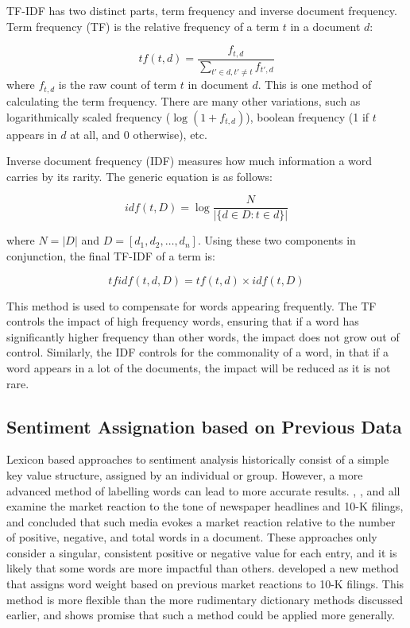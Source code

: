 TF-IDF has two distinct parts, term frequency and inverse document frequency. Term frequency (TF) is the relative frequency of a term $t$ in a document $d$:

\begin{equation}
tf(t,d) =  \frac{f_{t,d}}{\sum_{t'\in d, t' \neq t} f_{t',d}}
\end{equation}
where $f_{t,d}$ is the raw count of term $t$ in document $d$. This is one method of calculating the term frequency. There are many other variations, such as logarithmically scaled frequency ($\log(1 + f_{t,d})$), boolean frequency (1 if $t$ appears in $d$ at all, and 0 otherwise), etc.

Inverse document frequency (IDF) measures how much information a word carries by its rarity. The generic equation is as follows:

\begin{equation}
idf(t,D) = \log \frac{N}{|\{d \in D: t \in d\}|}
\end{equation}

\noindent
where $N = |D|$ and $D = [d_1, d_2, \dots, d_n]$. Using these two components in conjunction, the final TF-IDF of a term is:

\begin{equation}
tfidf(t,d,D) = tf(t,d) \times idf(t,D)
\end{equation}

\noindent
This method is used to compensate for words appearing frequently. The TF controls the impact of high frequency words, ensuring that if a word has significantly higher frequency than other words, the impact does not grow out of control. Similarly, the IDF controls for the commonality of a word, in that if a word appears in a lot of the documents, the impact will be reduced as it is not rare.

\subsection{Sentiment Assignation based on Previous Data}
Lexicon based approaches to sentiment analysis historically consist of a simple key value structure, assigned by an individual or group. However, a more advanced method of labelling words can lead to more accurate results. \textcite{tetlock2007content}, \textcite{tetlock2008quantifying}, and \textcite{lm-dict} all examine the market reaction to the tone of newspaper headlines and 10-K filings, and concluded that such media evokes a market reaction relative to the number of positive, negative, and total words in a document. These approaches only consider a singular, consistent positive or negative value for each entry, and it is likely that some words are more impactful than others. \textcite{jegadeesh2013word} developed a new method that assigns word weight based on previous market reactions to 10-K filings. This method is more flexible than the more rudimentary dictionary methods discussed earlier, and shows promise that such a method could be applied more generally.

